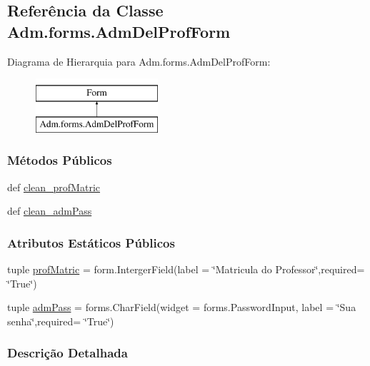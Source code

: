 \hypertarget{classAdm_1_1forms_1_1AdmDelProfForm}{\subsection{Referência da Classe Adm.\-forms.\-Adm\-Del\-Prof\-Form}
\label{classAdm_1_1forms_1_1AdmDelProfForm}
}
Diagrama de Hierarquia para Adm.\-forms.\-Adm\-Del\-Prof\-Form\-:\begin{figure}[H]
\begin{center}
\leavevmode
\includegraphics[height=2.000000cm]{dd/d81/classAdm_1_1forms_1_1AdmDelProfForm}
\end{center}
\end{figure}
\subsubsection*{Métodos Públicos}
\begin{DoxyCompactItemize}
\item 
def \hyperlink{classAdm_1_1forms_1_1AdmDelProfForm_aad92572be5ea398d700b331c79cc608e}{clean\-\_\-prof\-Matric}
\item 
def \hyperlink{classAdm_1_1forms_1_1AdmDelProfForm_a80ed7e862c1d77fa2fc83134692304aa}{clean\-\_\-adm\-Pass}
\end{DoxyCompactItemize}
\subsubsection*{Atributos Estáticos Públicos}
\begin{DoxyCompactItemize}
\item 
tuple \hyperlink{classAdm_1_1forms_1_1AdmDelProfForm_a3b53155ed7b63a0ad994c47305061ca1}{prof\-Matric} = form.\-Interger\-Field(label = \char`\"{}Matricula do Professor\char`\"{},required= \char`\"{}True\char`\"{})
\item 
tuple \hyperlink{classAdm_1_1forms_1_1AdmDelProfForm_a5c75c479d2d63fb207af1fd9eb1d85ad}{adm\-Pass} = forms.\-Char\-Field(widget = forms.\-Password\-Input, label = \char`\"{}Sua senha\char`\"{},required= \char`\"{}True\char`\"{})
\end{DoxyCompactItemize}


\subsubsection{Descrição Detalhada}


